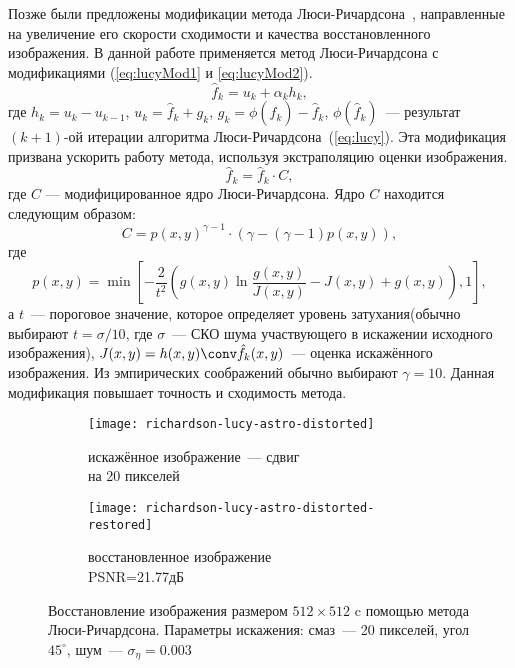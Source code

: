 Позже были предложены модификации метода Люси-Ричардсона~\cite{richardsonLucyModifiedBiggs}, направленные на увеличение его скорости сходимости и качества восстановленного изображения. В данной работе применяется метод Люси-Ричардсона с модификациями (\ref{eq:lucyMod1} и \ref{eq:lucyMod2}).
\begin{equation}\label{eq:lucyMod1}
	\hat{f}_k=u_k+\alpha_k h_k,
\end{equation}
где $h_k = u_k - u_{k-1}$, $u_k = \hat{f}_k + g_k$, $g_k = \phi(\hat{f}_k)-\hat{f}_k$, $\phi(\hat{f}_k)$~--- результат $(k+1)$-ой итерации алгоритма Люси-Ричардсона~(\ref{eq:lucy}). Эта модификация призвана ускорить работу метода, используя экстраполяцию оценки изображения.   
\begin{equation}\label{eq:lucyMod2}
	\hat{f}_k=\hat{f}_k \cdot C,
\end{equation}
где $C$ — модифицированное ядро Люси-Ричардсона. Ядро $C$ находится следующим образом:
\begin{equation}
	C = p(x,y)^{\gamma-1}\cdot (\gamma-(\gamma-1)p(x,y)),
\end{equation}
где
\begin{equation}
	p(x,y) = \min\left[
		-\frac{2}{t^2}\left(
			g(x,y)\ln\frac{g(x,y)}{J(x,y)}-J(x,y)+g(x,y)
		\right), 1
	\right],
\end{equation}
а $t$~--- пороговое значение, которое определяет уровень затухания(обычно выбирают $t=\sigma/10$, где $\sigma$~--- СКО шума участвующего в искажении исходного изображения), $J(x,y) =h(x,y) \conv \hat{f}_k(x,y)$~--- оценка искажённого изображения. Из эмпирических соображений обычно выбирают $\gamma=10$. Данная модификация повышает точность и сходимость метода. 

\begin{figure}[h!]
	\begin{subfigure}[b]{0.45\textwidth}
		\texttt{[image: richardson-lucy-astro-distorted]}
		\caption{искажённое изображение~--- сдвиг \\на 20 пикселей}
		\label{fig:astroLucyBlurred}
	\end{subfigure}%
	\hfill
	\begin{subfigure}[b]{0.45\textwidth}
		\texttt{[image: richardson-lucy-astro-distorted-restored]}
		\caption{восстановленное изображение\\ PSNR=21.77дБ}
		\label{fig:astroLucyRestored}
	\end{subfigure}%
	\caption{Восстановление изображения размером $512\times 512$ c помощью метода Люси-Ричардсона. Параметры искажения: смаз~--- 20 пикселей, угол $45^\circ$, шум~--- $\sigma_\eta=0.003$}
	\label{fig:richardsonLucy}
\end{figure}

